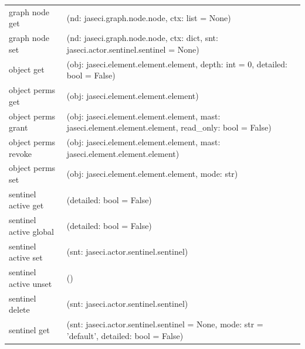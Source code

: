 {\begin{longtable}{l p{10cm}}
        graph node get                      & (nd: jaseci.graph.node.node, ctx: list = None)                                                                        \\
        graph node set                      & (nd: jaseci.graph.node.node, ctx: dict, snt: jaseci.actor.sentinel.sentinel = None)                                   \\
        object get                          & (obj: jaseci.element.element.element, depth: int = 0, detailed: bool = False)                                         \\
        object perms get                    & (obj: jaseci.element.element.element)                                                                                 \\
        object perms grant                  & (obj: jaseci.element.element.element, mast: jaseci.element.element.element, read\_only: bool = False)                 \\
        object perms revoke                 & (obj: jaseci.element.element.element, mast: jaseci.element.element.element)                                           \\
        object perms set                    & (obj: jaseci.element.element.element, mode: str)                                                                      \\
        sentinel active get                 & (detailed: bool = False)                                                                                              \\
        sentinel active global              & (detailed: bool = False)                                                                                              \\
        sentinel active set                 & (snt: jaseci.actor.sentinel.sentinel)                                                                                 \\
        sentinel active unset               & ()                                                                                                                    \\
        sentinel delete                     & (snt: jaseci.actor.sentinel.sentinel)                                                                                 \\
        sentinel get                        & (snt: jaseci.actor.sentinel.sentinel = None, mode: str = 'default', detailed: bool = False)                           \\

\end{longtable}}

